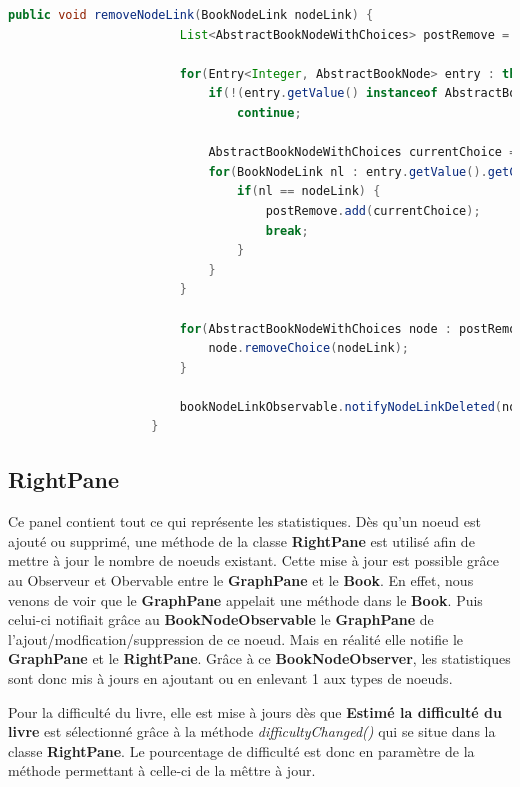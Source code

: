 				\begin{lstlisting}[gobble=20, language=java, caption=Classe NodeLinkFxListener avec le mode DELETE]
					public void removeNodeLink(BookNodeLink nodeLink) {
						List<AbstractBookNodeWithChoices> postRemove = new ArrayList<>();

						for(Entry<Integer, AbstractBookNode> entry : this.nodes.entrySet()) {
							if(!(entry.getValue() instanceof AbstractBookNodeWithChoices))
								continue;

							AbstractBookNodeWithChoices currentChoice = (AbstractBookNodeWithChoices) entry.getValue();
							for(BookNodeLink nl : entry.getValue().getChoices()) {
								if(nl == nodeLink) {
									postRemove.add(currentChoice);
									break;
								}
							}
						}

						for(AbstractBookNodeWithChoices node : postRemove) {
							node.removeChoice(nodeLink);
						}

						bookNodeLinkObservable.notifyNodeLinkDeleted(nodeLink);
					}
				\end{lstlisting}



		\subsection{RightPane}

		Ce panel contient tout ce qui représente les statistiques. Dès qu'un noeud est ajouté ou supprimé, une méthode de la classe \textbf{RightPane} est utilisé afin de mettre à jour le nombre de noeuds existant. Cette mise à jour est possible grâce au Observeur et Obervable entre le \textbf{GraphPane} et le \textbf{Book}. En effet, nous venons de voir que le \textbf{GraphPane} appelait une méthode dans le \textbf{Book}. Puis celui-ci notifiait grâce au \textbf{BookNodeObservable} le \textbf{GraphPane} de l'ajout/modfication/suppression de ce noeud. Mais en réalité elle notifie le \textbf{GraphPane} et le \textbf{RightPane}. Grâce à ce \textbf{BookNodeObserver}, les statistiques sont donc mis à jours en ajoutant ou en enlevant 1 aux types de noeuds.

		Pour la difficulté du livre, elle est mise à jours dès que \textbf{Estimé la difficulté du livre} est sélectionné grâce à la méthode \textit{difficultyChanged()} qui se situe dans la classe \textbf{RightPane}. Le pourcentage de difficulté est donc en paramètre de la méthode permettant à celle-ci de la mêttre à jour.\\

